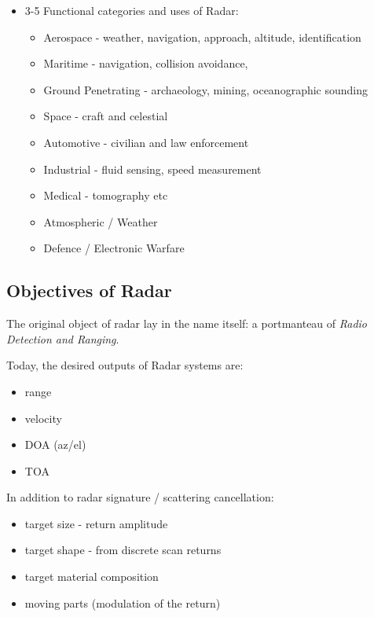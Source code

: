 \begin{itemize}
    \item 3-5 Functional categories and uses of Radar: \cite{noauthor_radar_nodate, desai_how_2022}
    \begin{itemize}
        \item Aerospace - weather, navigation, approach, altitude, identification
        \item Maritime - navigation, collision avoidance,  
        \item Ground Penetrating - archaeology, mining, oceanographic sounding
        \item Space - craft and celestial
        \item Automotive - civilian and law enforcement
        \item Industrial - fluid sensing, speed measurement
        \item Medical - tomography etc
        \item Atmospheric / Weather
        \item Defence / Electronic Warfare
   \end{itemize}
\end{itemize}

\subsection{Objectives of Radar}

The original object of radar lay in the name itself: a portmanteau of \textit{Radio Detection and Ranging}. \cite{policy_radar_1945}

Today, the desired outputs of Radar systems are: \cite{stimson_introduction_1998}

\begin{itemize}
    \item range
    \item velocity
    \item DOA (az/el)
    \item TOA
\end{itemize}

In addition to radar signature / scattering cancellation:\cite{jenn_radar_2007}
\begin{itemize}
    \item target size - return amplitude
    \item target shape - from discrete scan returns
    \item target material composition
    \item moving parts (modulation of the return)
\end{itemize}

